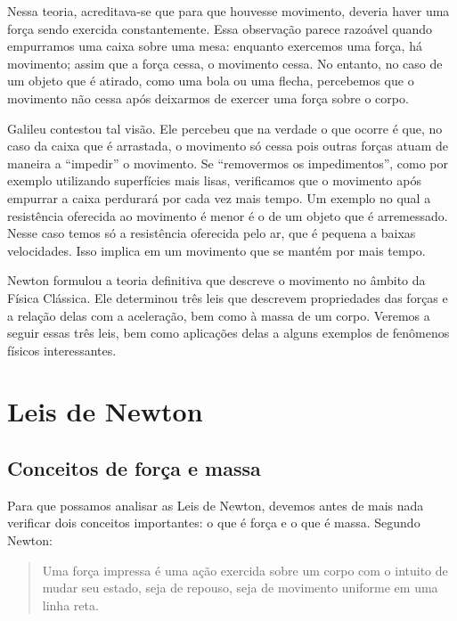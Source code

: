 Nessa teoria, acreditava-se que para que houvesse movimento, deveria haver uma força sendo exercida constantemente. Essa observação parece razoável quando empurramos uma caixa sobre uma mesa: enquanto exercemos uma força, há movimento; assim que a força cessa, o movimento cessa. No entanto, no caso de um objeto que é atirado, como uma bola ou uma flecha, percebemos que o movimento não cessa após deixarmos de exercer uma força sobre o corpo.

Galileu contestou tal visão. Ele percebeu que na verdade o que ocorre é que, no caso da caixa que é arrastada, o movimento só cessa pois outras forças atuam de maneira a ``impedir'' o movimento. Se ``removermos os impedimentos'', como por exemplo utilizando superfícies mais lisas, verificamos que o movimento após empurrar a caixa perdurará por cada vez mais tempo. Um exemplo no qual a resistência oferecida ao movimento é menor é o de um objeto que é arremessado. Nesse caso temos só a resistência oferecida pelo ar, que é pequena a baixas velocidades. Isso implica em um movimento que se mantém por mais tempo.

Newton formulou a teoria definitiva que descreve o movimento no âmbito da Física Clássica. Ele determinou três leis que descrevem propriedades das forças e a relação delas com a aceleração, bem como à massa de um corpo. Veremos a seguir essas três leis, bem como aplicações delas a alguns exemplos de fenômenos físicos interessantes.

\section{Leis de Newton}


\subsection{Conceitos de força e massa}
\label{Sec:ConceitosDeMassaEForca}

Para que possamos analisar as Leis de Newton, devemos antes de mais nada verificar dois conceitos importantes: o que é força e o que é massa. Segundo Newton:

\begin{quote}
    Uma força impressa é uma ação exercida sobre um corpo com o intuito de mudar seu estado, seja de repouso, seja de movimento uniforme em uma linha reta.
\end{quote}

